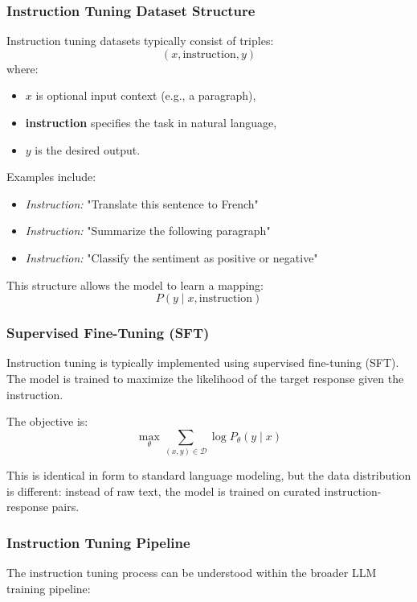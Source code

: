 \documentclass{article}
\begin{document}
\subsubsection{Instruction Tuning Dataset Structure}

Instruction tuning datasets typically consist of triples:
\[
(x, \text{instruction}, y)
\]
where:
\begin{itemize}
    \item $x$ is optional input context (e.g., a paragraph),
    \item \textbf{instruction} specifies the task in natural language,
    \item $y$ is the desired output.
\end{itemize}

Examples include:
\begin{itemize}
    \item \textit{Instruction:} "Translate this sentence to French"  
    \item \textit{Instruction:} "Summarize the following paragraph"  
    \item \textit{Instruction:} "Classify the sentiment as positive or negative"
\end{itemize}

This structure allows the model to learn a mapping:
\[
P(y \mid x, \text{instruction})
\]

\subsubsection{Supervised Fine-Tuning (SFT)}

Instruction tuning is typically implemented using supervised fine-tuning (SFT). The model is trained to maximize the likelihood of the target response given the instruction.

The objective is:
\[
\max_\theta \sum_{(x,y)\in \mathcal{D}} \log P_\theta(y \mid x)
\]

This is identical in form to standard language modeling, but the data distribution is different: instead of raw text, the model is trained on curated instruction-response pairs.

\subsubsection{Instruction Tuning Pipeline}

The instruction tuning process can be understood within the broader LLM training pipeline:
\end{document}
